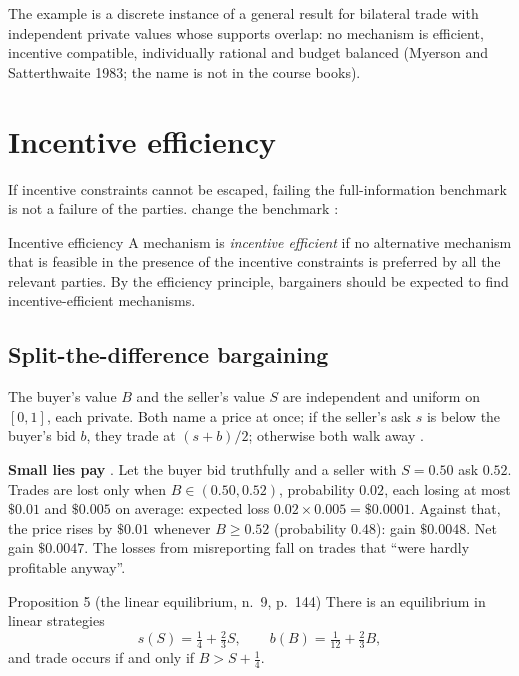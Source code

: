 The example is a discrete instance of a general result for bilateral trade with independent
private values whose supports overlap: no mechanism is efficient, incentive compatible, individually
rational and budget balanced (Myerson and Satterthwaite 1983; the name is not in the course
books).

\section{Incentive efficiency}\label{sec:b-ie}

If incentive constraints cannot be escaped, failing the full-information benchmark is not a
failure of the parties. \MR{} change the benchmark :

\begin{defn}{Incentive efficiency}
A mechanism is \emph{incentive efficient} if no alternative mechanism that is feasible in the
presence of the incentive constraints is preferred by all the relevant parties. By the efficiency
principle, bargainers should be expected to find incentive-efficient mechanisms.
\end{defn}

\subsection{Split-the-difference bargaining}

The buyer's value $B$ and the seller's value $S$ are independent and uniform on $[0,1]$, each
private. Both name a price at once; if the seller's ask $s$ is below the buyer's bid $b$, they
trade at $(s + b)/2$; otherwise both walk away .

\textbf{Small lies pay} . Let the buyer bid truthfully and a seller with $S = 0.50$ ask
$0.52$. Trades are lost only when $B \in (0.50, 0.52)$, probability $0.02$, each losing at most
$\$0.01$ and $\$0.005$ on average: expected loss $0.02 \times 0.005 = \$0.0001$. Against that, the
price rises by $\$0.01$ whenever $B \ge 0.52$ (probability $0.48$): gain $\$0.0048$. Net gain
$\$0.0047$. The losses from misreporting fall on trades that ``were hardly profitable anyway''.

\begin{prop}{Proposition 5 (the linear equilibrium, \MR{} n.~9, p.~144)}
There is an equilibrium in linear strategies
\[
  s(S) = \tfrac14 + \tfrac23 S, \qquad b(B) = \tfrac1{12} + \tfrac23 B,
\]
and trade occurs if and only if $B > S + \tfrac14$.
\end{prop}

